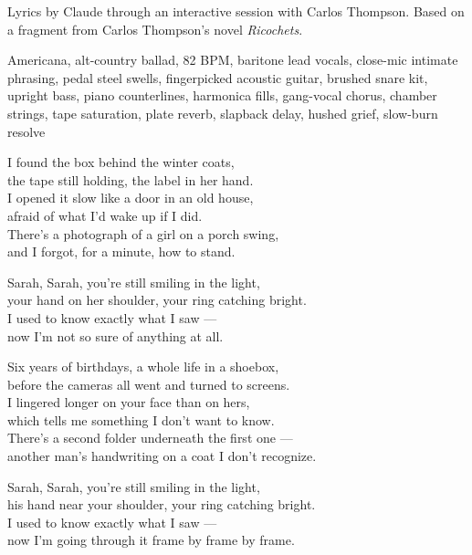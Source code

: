 
\begin{notes}
Lyrics by Claude through an interactive session with Carlos Thompson. %
Based on a fragment from Carlos Thompson's novel \emph{Ricochets}.
\end{notes}
\begin{style}
Americana, alt-country ballad, 82 BPM, baritone lead vocals, close-mic intimate phrasing, pedal steel swells, fingerpicked acoustic guitar, brushed snare kit, upright bass, piano counterlines, harmonica fills, gang-vocal chorus, chamber strings, tape saturation, plate reverb, slapback delay, hushed grief, slow-burn resolve
\end{style}
\begin{lyrics}
I found the box behind the winter coats,\\
the tape still holding, the label in her hand.\\
I opened it slow like a door in an old house,\\
afraid of what I'd wake up if I did.\\
There's a photograph of a girl on a porch swing,\\
and I forgot, for a minute, how to stand.

Sarah, Sarah, you're still smiling in the light,\\
your hand on her shoulder, your ring catching bright.\\
I used to know exactly what I saw —\\
now I'm not so sure of anything at all.

Six years of birthdays, a whole life in a shoebox,\\
before the cameras all went and turned to screens.\\
I lingered longer on your face than on hers,\\
which tells me something I don't want to know.\\
There's a second folder underneath the first one —\\
another man's handwriting on a coat I don't recognize.

Sarah, Sarah, you're still smiling in the light,\\
his hand near your shoulder, your ring catching bright.\\
I used to know exactly what I saw —\\
now I'm going through it frame by frame by frame.


\end{lyrics}
